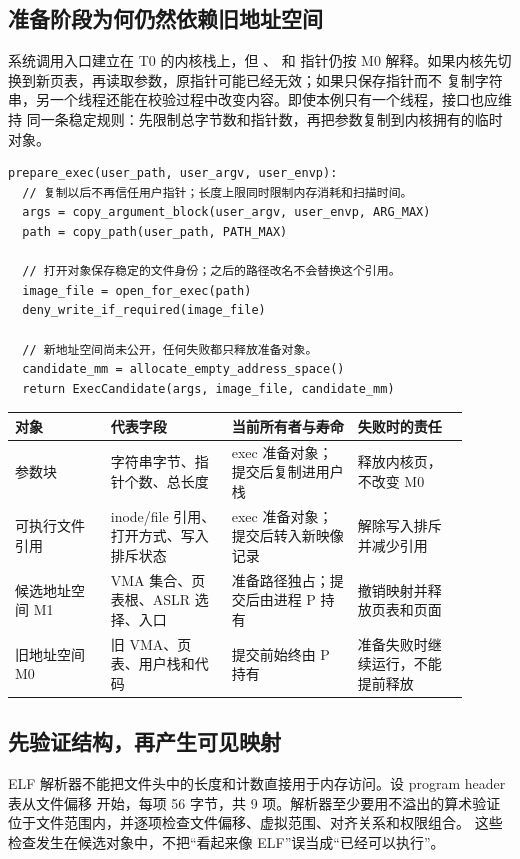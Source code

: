 \subsection{准备阶段为何仍然依赖旧地址空间}

系统调用入口建立在 T0 的内核栈上，但 、 和  指针仍按
M0 解释。如果内核先切换到新页表，再读取参数，原指针可能已经无效；如果只保存指针而不
复制字符串，另一个线程还能在校验过程中改变内容。即使本例只有一个线程，接口也应维持
同一条稳定规则：先限制总字节数和指针数，再把参数复制到内核拥有的临时对象。

\begin{lstlisting}
prepare_exec(user_path, user_argv, user_envp):
  // 复制以后不再信任用户指针；长度上限同时限制内存消耗和扫描时间。
  args = copy_argument_block(user_argv, user_envp, ARG_MAX)
  path = copy_path(user_path, PATH_MAX)

  // 打开对象保存稳定的文件身份；之后的路径改名不会替换这个引用。
  image_file = open_for_exec(path)
  deny_write_if_required(image_file)

  // 新地址空间尚未公开，任何失败都只释放准备对象。
  candidate_mm = allocate_empty_address_space()
  return ExecCandidate(args, image_file, candidate_mm)
\end{lstlisting}

\begin{longtable}{|L{0.19\linewidth}|L{0.24\linewidth}|L{0.25\linewidth}|L{0.22\linewidth}|}
\hline
对象 & 代表字段 & 当前所有者与寿命 & 失败时的责任 \\ \hline
参数块 & 字符串字节、指针个数、总长度 & exec 准备对象；提交后复制进用户栈 &
释放内核页，不改变 M0 \\\tablerowrule
可执行文件引用 & inode/file 引用、打开方式、写入排斥状态 & exec 准备对象；提交后转入新映像记录 &
解除写入排斥并减少引用 \\\tablerowrule
候选地址空间 M1 & VMA 集合、页表根、ASLR 选择、入口 & 准备路径独占；提交后由进程 P 持有 &
撤销映射并释放页表和页面 \\\tablerowrule
旧地址空间 M0 & 旧 VMA、页表、用户栈和代码 & 提交前始终由 P 持有 &
准备失败时继续运行，不能提前释放 \\ \hline
\end{longtable}

\subsection{先验证结构，再产生可见映射}

ELF 解析器不能把文件头中的长度和计数直接用于内存访问。设 program header 表从文件偏移
 开始，每项 56 字节，共 9 项。解析器至少要用不溢出的算术验证
 位于文件范围内，并逐项检查文件偏移、虚拟范围、对齐关系和权限组合。
这些检查发生在候选对象中，不把“看起来像 ELF”误当成“已经可以执行”。

